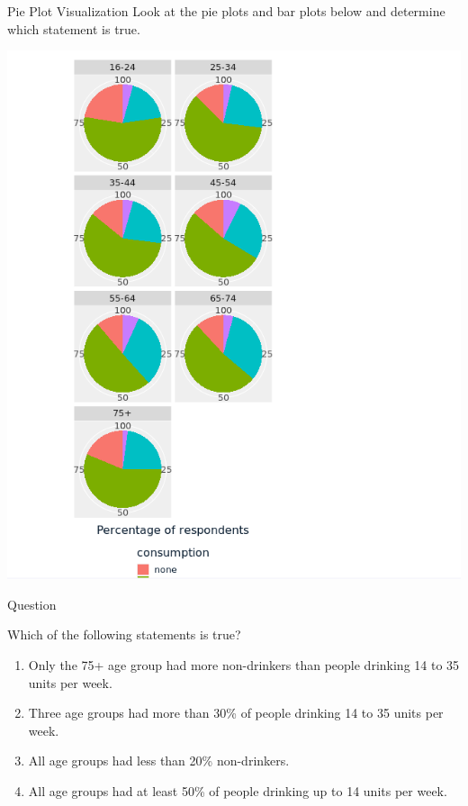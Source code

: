 \documentclass[
  ignorenonframetext,
]{beamer}
\providecommand{\tightlist}{%
  \setlength{\itemsep}{0pt}\setlength{\parskip}{0pt}}
\begin{document}
\begin{frame}{Pie Plot Visualization}
\label{pie-plot-visualization}
Look at the pie plots and bar plots below and determine which statement
is true.

\includegraphics{../images/im106.png}
\end{frame}

\begin{frame}{Question}
\label{question-7}
\begin{block}{Which of the following statements is true?}
\label{which-of-the-following-statements-is-true}
\begin{enumerate}
\tightlist
\item
  Only the 75+ age group had more non-drinkers than people drinking 14
  to 35 units per week.
\item
  Three age groups had more than 30\% of people drinking 14 to 35 units
  per week.
\item
  All age groups had less than 20\% non-drinkers.
\item
  All age groups had at least 50\% of people drinking up to 14 units per
  week.
\end{enumerate}
\end{block}
\end{frame}
\end{document}
